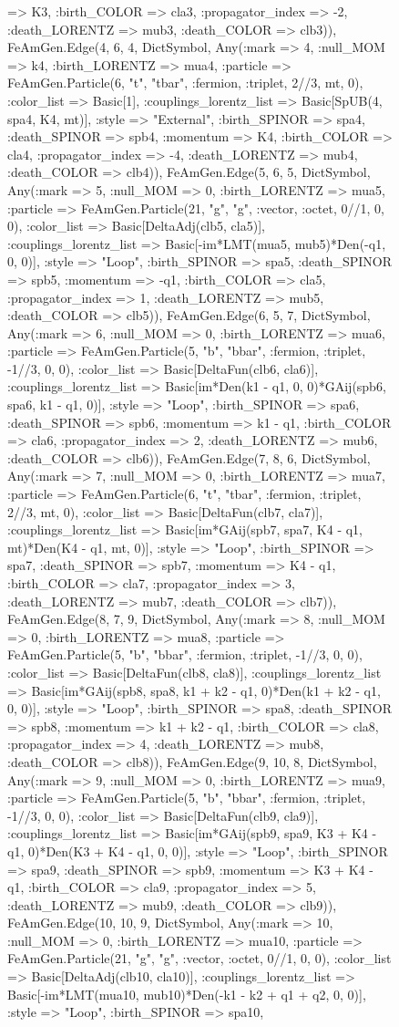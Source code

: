 \documentclass{revtex4}
\begin{document}
\begin{figure}[!htb]
\begin{center}
{=> K3, :birth_COLOR => cla3, :propagator_index => -2, :death_LORENTZ => mub3, :death_COLOR => clb3)), FeAmGen.Edge(4, 6, 4, Dict{Symbol, Any}(:mark => 4, :null_MOM => k4, :birth_LORENTZ => mua4, :particle => FeAmGen.Particle(6, "t", "tbar", :fermion, :triplet, 2//3, mt, 0), :color_list => Basic[1], :couplings_lorentz_list => Basic[SpUB(4, spa4, K4, mt)], :style => "External", :birth_SPINOR => spa4, :death_SPINOR => spb4, :momentum => K4, :birth_COLOR => cla4, :propagator_index => -4, :death_LORENTZ => mub4, :death_COLOR => clb4)), FeAmGen.Edge(5, 6, 5, Dict{Symbol, Any}(:mark => 5, :null_MOM => 0, :birth_LORENTZ => mua5, :particle => FeAmGen.Particle(21, "g", "g", :vector, :octet, 0//1, 0, 0), :color_list => Basic[DeltaAdj(clb5, cla5)], :couplings_lorentz_list => Basic[-im*LMT(mua5, mub5)*Den(-q1, 0, 0)], :style => "Loop", :birth_SPINOR => spa5, :death_SPINOR => spb5, :momentum => -q1, :birth_COLOR => cla5, :propagator_index => 1, :death_LORENTZ => mub5, :death_COLOR => clb5)), FeAmGen.Edge(6, 5, 7, Dict{Symbol, Any}(:mark => 6, :null_MOM => 0, :birth_LORENTZ => mua6, :particle => FeAmGen.Particle(5, "b", "bbar", :fermion, :triplet, -1//3, 0, 0), :color_list => Basic[DeltaFun(clb6, cla6)], :couplings_lorentz_list => Basic[im*Den(k1 - q1, 0, 0)*GAij(spb6, spa6, k1 - q1, 0)], :style => "Loop", :birth_SPINOR => spa6, :death_SPINOR => spb6, :momentum => k1 - q1, :birth_COLOR => cla6, :propagator_index => 2, :death_LORENTZ => mub6, :death_COLOR => clb6)), FeAmGen.Edge(7, 8, 6, Dict{Symbol, Any}(:mark => 7, :null_MOM => 0, :birth_LORENTZ => mua7, :particle => FeAmGen.Particle(6, "t", "tbar", :fermion, :triplet, 2//3, mt, 0), :color_list => Basic[DeltaFun(clb7, cla7)], :couplings_lorentz_list => Basic[im*GAij(spb7, spa7, K4 - q1, mt)*Den(K4 - q1, mt, 0)], :style => "Loop", :birth_SPINOR => spa7, :death_SPINOR => spb7, :momentum => K4 - q1, :birth_COLOR => cla7, :propagator_index => 3, :death_LORENTZ => mub7, :death_COLOR => clb7)), FeAmGen.Edge(8, 7, 9, Dict{Symbol, Any}(:mark => 8, :null_MOM => 0, :birth_LORENTZ => mua8, :particle => FeAmGen.Particle(5, "b", "bbar", :fermion, :triplet, -1//3, 0, 0), :color_list => Basic[DeltaFun(clb8, cla8)], :couplings_lorentz_list => Basic[im*GAij(spb8, spa8, k1 + k2 - q1, 0)*Den(k1 + k2 - q1, 0, 0)], :style => "Loop", :birth_SPINOR => spa8, :death_SPINOR => spb8, :momentum => k1 + k2 - q1, :birth_COLOR => cla8, :propagator_index => 4, :death_LORENTZ => mub8, :death_COLOR => clb8)), FeAmGen.Edge(9, 10, 8, Dict{Symbol, Any}(:mark => 9, :null_MOM => 0, :birth_LORENTZ => mua9, :particle => FeAmGen.Particle(5, "b", "bbar", :fermion, :triplet, -1//3, 0, 0), :color_list => Basic[DeltaFun(clb9, cla9)], :couplings_lorentz_list => Basic[im*GAij(spb9, spa9, K3 + K4 - q1, 0)*Den(K3 + K4 - q1, 0, 0)], :style => "Loop", :birth_SPINOR => spa9, :death_SPINOR => spb9, :momentum => K3 + K4 - q1, :birth_COLOR => cla9, :propagator_index => 5, :death_LORENTZ => mub9, :death_COLOR => clb9)), FeAmGen.Edge(10, 10, 9, Dict{Symbol, Any}(:mark => 10, :null_MOM => 0, :birth_LORENTZ => mua10, :particle => FeAmGen.Particle(21, "g", "g", :vector, :octet, 0//1, 0, 0), :color_list => Basic[DeltaAdj(clb10, cla10)], :couplings_lorentz_list => Basic[-im*LMT(mua10, mub10)*Den(-k1 - k2 + q1 + q2, 0, 0)], :style => "Loop", :birth_SPINOR => spa10, }
\end{center}
\end{figure}
\end{document}

